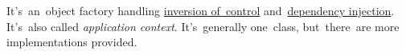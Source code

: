 \label{springcontainrer}
It's~an~object factory handling \hyperref[inversionofcontrol]{inversion of~control} and~\hyperref[dependencyinjection]{dependency injection}. It's~also called \textit{application context}. It's~generally one~class, but~there~are more implementations provided.
